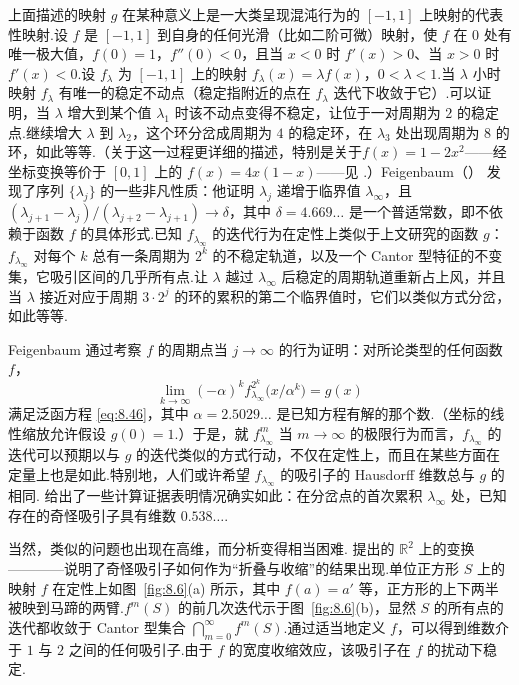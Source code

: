 上面描述的映射 $g$ 在某种意义上是一大类呈现混沌行为的 $[-1,1]$ 上映射的代表性映射.设 $f$ 是 $[-1,1]$ 到自身的任何光滑（比如二阶可微）映射，使 $f$ 在 $0$ 处有唯一极大值，$f(0)=1$，$f''(0)<0$，且当 $x<0$ 时 $f'(x)>0$、当 $x>0$ 时 $f'(x)<0$.设 $f_\lambda$ 为 $[-1,1]$ 上的映射 $f_\lambda(x)=\lambda f(x)$，$0<\lambda<1$.当 $\lambda$ 小时映射 $f_\lambda$ 有唯一的稳定不动点（稳定指附近的点在 $f_\lambda$ 迭代下收敛于它）.可以证明，当 $\lambda$ 增大到某个值 $\lambda_1$ 时该不动点变得不稳定，让位于一对周期为 $2$ 的稳定点.继续增大 $\lambda$ 到 $\lambda_2$，这个环分岔成周期为 $4$ 的稳定环，在 $\lambda_3$ 处出现周期为 $8$ 的环，如此等等.（关于这一过程更详细的描述，特别是关于$f(x)=1-2x^2$——经坐标变换等价于 $[0,1]$ 上的 $f(x)=4x(1-x)$——见 \textcite{may1976,hofstadter1981,feigenbaum1981}.）Feigenbaum（\citeyear{feigenbaum1978,feigenbaum1979,feigenbaum1981}） 发现了序列 $\{\lambda_j\}$ 的一些非凡性质：他证明 $\lambda_j$ 递增于临界值 $\lambda_\infty$，且 $(\lambda_{j+1}-\lambda_j)/(\lambda_{j+2}-\lambda_{j+1})\to\delta$，其中 $\delta=4.669\ldots$ 是一个普适常数，即不依赖于函数 $f$ 的具体形式.已知 $f_{\lambda_\infty}$ 的迭代行为在定性上类似于上文研究的函数 $g$：$f_{\lambda_\infty}$ 对每个 $k$ 总有一条周期为 $2^k$ 的不稳定轨道，以及一个 Cantor 型特征的不变集，它吸引区间的几乎所有点.让 $\lambda$ 越过 $\lambda_\infty$ 后稳定的周期轨道重新占上风，并且当 $\lambda$ 接近对应于周期 $3\cdot 2^j$ 的环的累积的第二个临界值时，它们以类似方式分岔，如此等等.

Feigenbaum 通过考察 $f$ 的周期点当 $j\to\infty$ 的行为证明：对所论类型的任何函数 $f$，
\[
  \lim_{k\to\infty}(-\alpha)^{k}f_{\lambda_\infty}^{2^{k}}\bigl(x/\alpha^{k}\bigr)=g(x)
\]
满足泛函方程 \eqref{eq:8.46}，其中 $\alpha=2.5029\ldots$ 是已知方程有解的那个数.（坐标的线性缩放允许假设 $g(0)=1$.）于是，就 $f_{\lambda_\infty}^m$ 当 $m\to\infty$ 的极限行为而言，$f_{\lambda_\infty}$ 的迭代可以预期以与 $g$ 的迭代类似的方式行动，不仅在定性上，而且在某些方面在定量上也是如此.特别地，人们或许希望 $f_{\lambda_\infty}$ 的吸引子的 Hausdorff 维数总与 $g$ 的相同.\textcite{grassberger1981} 给出了一些计算证据表明情况确实如此：在分岔点的首次累积 $\lambda_\infty$ 处，已知存在的奇怪吸引子具有维数 $0.538\ldots$.

当然，类似的问题也出现在高维，而分析变得相当困难.\textcite{smale1967} 提出的 $\mathbb{R}^2$ 上的变换————说明了奇怪吸引子如何作为``折叠与收缩''的结果出现.单位正方形 $S$ 上的映射 $f$ 在定性上如图~\ref{fig:8.6}(a) 所示，其中 $f(a)=a'$ 等，正方形的上下两半被映到马蹄的两臂.$f^m(S)$ 的前几次迭代示于图~\ref{fig:8.6}(b)，显然 $S$ 的所有点的迭代都收敛于 Cantor 型集合 $\bigcap_{m=0}^{\infty}f^m(S)$.通过适当地定义 $f$，可以得到维数介于 $1$ 与 $2$ 之间的任何吸引子.由于 $f$ 的宽度收缩效应，该吸引子在 $f$ 的扰动下稳定.

